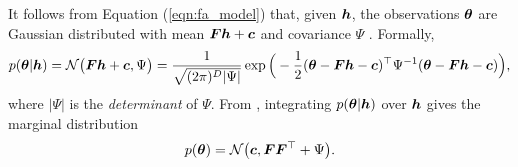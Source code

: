 \documentclass[10pt]{article} %
\begin{document}
It follows from Equation (\ref{eqn:fa_model}) that, given ${\bm{h}}$, the observations ${\bm{\theta}}$ are Gaussian distributed with mean ${\bm{F}} {\bm{h}} + {\bm{c}}$ and covariance $\Psi$ \citep{barber2007}. Formally,
\begin{equation}\label{eqn:fa_cond_dist}
	p({\bm{\theta}} | {\bm{h}}) 
	= \mathcal{N}\big( {\bm{F}} {\bm{h}} + {\bm{c}}, \Psi \big)
	= \frac{1}{\sqrt{(2\pi)^D |\Psi|}} 
	\exp \Big(-\frac{1}{2} ({\bm{\theta}} - {\bm{F}} {\bm{h}} - {\bm{c}})^\top \Psi^{-1} ({\bm{\theta}} - {\bm{F}} {\bm{h}} - {\bm{c}})\Big),
\end{equation}
where $|\Psi|$ is the \emph{determinant} of $\Psi$. From \citep{barber2007}, integrating $p({\bm{\theta}} | {\bm{h}})$ over ${\bm{h}}$ gives the marginal distribution
\begin{equation}\label{eqn:fa_marginal_dist}
	p({\bm{\theta}}) = \mathcal{N}\big({\bm{c}}, {\bm{F}} {\bm{F}}^{\top} + \Psi\big).
\end{equation}

\end{document}
